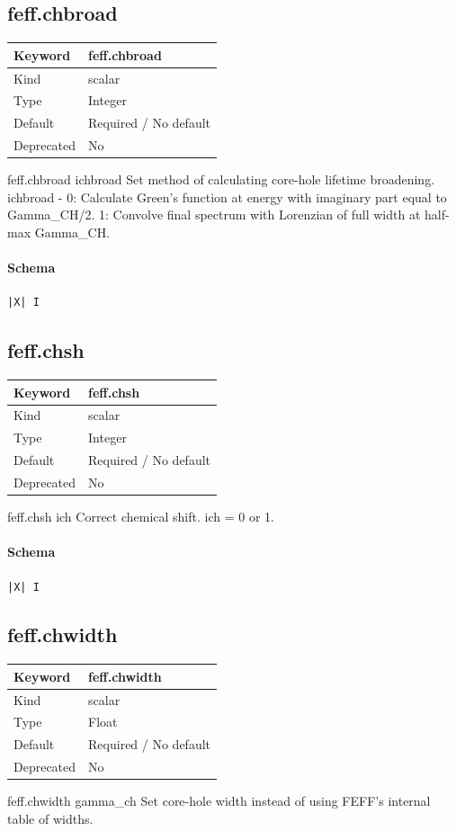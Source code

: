 \documentclass[11pt]{article}
\begin{document}
{{{\subsection{feff.chbroad}
\label{kw:feff-chbroad}
\begin{longtable}{|p{1.5in}|p{4.5in}|}
\hline
Keyword & feff.chbroad \\
\hline
Kind & scalar \\
\hline
Type & Integer \\
\hline
Default & Required / No default \\
\hline
Deprecated & No \\
\hline
\end{longtable}
 feff.chbroad{ ichbroad }
 Set method of calculating core-hole lifetime broadening.
 ichbroad -
            0: Calculate Green's function at energy with imaginary part equal
               to Gamma\_CH/2.
            1: Convolve final spectrum with Lorenzian of full width at
               half-max Gamma\_CH.

\paragraph{Schema}
\begin{Verbatim}
|X| I
\end{Verbatim}

\subsection{feff.chsh}
\label{kw:feff-chsh}
\begin{longtable}{|p{1.5in}|p{4.5in}|}
\hline
Keyword & feff.chsh \\
\hline
Kind & scalar \\
\hline
Type & Integer \\
\hline
Default & Required / No default \\
\hline
Deprecated & No \\
\hline
\end{longtable}
 feff.chsh{ ich }
 Correct chemical shift.
 ich = 0 or 1.

\paragraph{Schema}
\begin{Verbatim}
|X| I
\end{Verbatim}

\subsection{feff.chwidth}
\label{kw:feff-chwidth}
\begin{longtable}{|p{1.5in}|p{4.5in}|}
\hline
Keyword & feff.chwidth \\
\hline
Kind & scalar \\
\hline
Type & Float \\
\hline
Default & Required / No default \\
\hline
Deprecated & No \\
\hline
\end{longtable}
 feff.chwidth{ gamma\_ch }
 Set core-hole width instead of using FEFF's internal table of widths.

}}}
\end{document}
